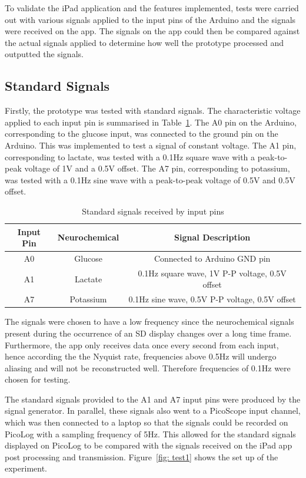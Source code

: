 To validate the iPad application and the features implemented, tests were carried out with various signals applied to the input pins of the Arduino and the signals were received on the app. The signals on the app could then be compared against the actual signals applied to determine how well the prototype processed and outputted the signals.



\subsection{Standard Signals}
Firstly, the prototype was tested with standard signals. The characteristic voltage applied to each input pin is summarised in Table~\ref{table: standard signals}. The A0 pin on the Arduino, corresponding to the glucose input, was connected to the ground pin on the Arduino. This was implemented to test a signal of constant voltage. The A1 pin, corresponding to lactate, was tested with a 0.1Hz square wave with a peak-to-peak voltage of 1V and a 0.5V offset. The A7 pin, corresponding to potassium, was tested with a 0.1Hz sine wave with a peak-to-peak voltage of 0.5V and 0.5V offset. 

\begin{table}[h!]
\centering
\begin{tabular}{||c c c||} 
 \hline
 Input Pin & Neurochemical & Signal Description \\ [0.5ex] 
 \hline\hline
 A0 & Glucose & Connected to Arduino GND pin \\
 A1 & Lactate & 0.1Hz square wave, 1V P-P voltage, 0.5V offset \\
 A7 & Potassium & 0.1Hz sine wave, 0.5V P-P voltage, 0.5V offset \\
 \hline
\end{tabular}
\caption{Standard signals received by input pins}
\label{table: standard signals}
\end{table}

The signals were chosen to have a low frequency since the neurochemical signals present during the occurrence of an SD display changes over a long time frame. Furthermore, the app only receives data once every second from each input, hence according the the Nyquist rate, frequencies above 0.5Hz will undergo aliasing and will not be reconstructed well. Therefore frequencies of 0.1Hz were chosen for testing.

The standard signals provided to the A1 and A7 input pins were produced by the signal generator. In parallel, these signals also went to a PicoScope input channel, which was then connected to a laptop so that the signals could be recorded on PicoLog with a sampling frequency of 5Hz. This allowed for the standard signals displayed on PicoLog to be compared with the signals received on the iPad app post processing and transmission. Figure~\ref{fig: test1} shows the set up of the experiment.

